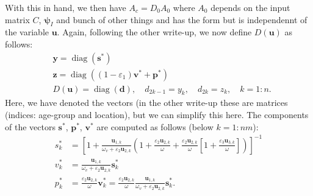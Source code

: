 \documentclass[12pt]{amsart}
\theoremstyle{definition}
\begin{document}
With this in hand, we then have $A_c=D_0A_0$ where $A_0$ depends on the input matrix $C$, $\bm \psi_I$ and bunch of other things and has the form but is independennt of the variable $\bm u$. Again, following the other write-up, we now define $D(\bm u)$ as follows:
\begin{equation}
\begin{aligned}
  &\bm{y}=\operatorname{diag}\left(\bm{s}^*\right)\\
  &\bm{z}=\operatorname{diag}\left((1-\varepsilon_1)\bm{v}^*
  +\bm{p}^*\right)\\
  &D(\bm{u})=\operatorname{diag}(\bm d), \quad  d_{2k-1}=y_k,\quad d_{2k}=z_{k}, \quad k=1:n.
  \end{aligned}
\end{equation}
Here, we have denoted the vectors (in the other write-up these are matrices (indices: age-group and location), but we can simplify this here.
The components of the vectors $\bm{s}^*$, $\bm{p}^*$, $\bm{v}^*$ are computed as follows (below $k=1:nm$):
\begin{equation}\label{si-def}
  \begin{aligned}
  s_{k}^* &= \left\lbrack
  1+\frac{\bm{u}_{1,k}}{\omega_v+\varepsilon_2\bm{u}_{2,k}}
  \left(1+\frac{\varepsilon_{2}\bm{u}_{2,k}}{\omega}+
  \frac{\varepsilon_{2}\bm{u}_{2,k}}{\omega}\left\lbrack
  1+\frac{\varepsilon_{3}\bm{u}_{3,k}}{\omega}
  \right\rbrack
  \right)
  \right\rbrack^{-1}\\
  v_{k}^*&=  \frac{\bm{u}_{1,k}}{\omega_{v}+\varepsilon_2\bm{u}_{2,k}} \bm{s}_k^*\\
  p_{k}^*&= \frac{\varepsilon_{2}\bm{u}_{2,k}}{\omega}\bm{v}_{k}^*=
  \frac{\varepsilon_{2}\bm{u}_{2,k}}{\omega}
  \frac{\bm{u}_{1,k}}{\omega_{v}+\varepsilon_2\bm{u}_{2,k}} \bm{s}_{k}^*. 
  \end{aligned}
  \end{equation}
\end{document}
